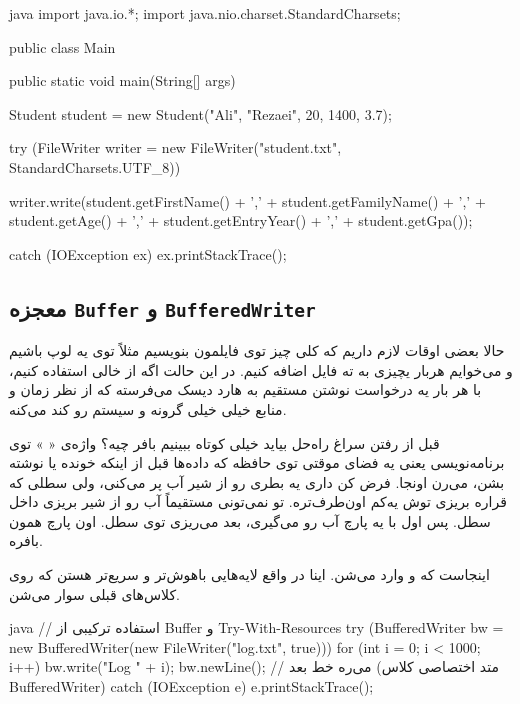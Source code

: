 \begin{codebox}{java}
import java.io.*;
import java.nio.charset.StandardCharsets;

public class Main {
    public static void main(String[] args) {
        Student student = new Student("Ali", "Rezaei", 20, 1400, 3.7);
        
        try (FileWriter writer = new FileWriter("student.txt", StandardCharsets.UTF_8)) {
            
            writer.write(student.getFirstName() + ',' + 
                         student.getFamilyName() + ',' +
                         student.getAge() + ',' + 
                         student.getEntryYear() + ',' + 
                         student.getGpa());
                         
        } catch (IOException ex) {
            ex.printStackTrace();
        }
    }
}
\end{codebox}

\subsection{معجزه \texttt{Buffer} و \texttt{BufferedWriter}}

حالا بعضی اوقات لازم داریم که کلی چیز توی فایلمون بنویسیم مثلاً توی یه
لوپ باشیم و می‌خوایم هربار یچیزی به ته فایل اضافه کنیم. در این حالت اگه
از  خالی استفاده کنیم، با هر بار
 یه درخواست نوشتن مستقیم به هارد دیسک می‌فرسته که از
نظر زمان و منابع خیلی خیلی گرونه و سیستم رو کند می‌کنه.

قبل از رفتن سراغ راه‌حل بیاید خیلی کوتاه ببینیم بافر چیه؟ واژه‌ی «
 » توی برنامه‌نویسی یعنی یه فضای موقتی توی حافظه  که
داده‌ها قبل از اینکه خونده یا نوشته بشن، می‌رن اونجا. فرض کن داری یه بطری
رو از شیر آب پر می‌کنی، ولی سطلی که قراره بریزی توش یه‌کم اون‌طرف‌تره. تو
نمی‌تونی مستقیماً آب رو از شیر بریزی داخل سطل. پس اول با یه پارچ آب رو
می‌گیری، بعد می‌ریزی توی سطل. اون پارچ همون بافره.

اینجاست که  و 
وارد می‌شن. اینا در واقع لایه‌هایی باهوش‌تر و سریع‌تر هستن که روی کلاس‌های
قبلی سوار می‌شن.

\begin{codebox}{java}
// استفاده ترکیبی از Buffer و Try-With-Resources
try (BufferedWriter bw = new BufferedWriter(new FileWriter("log.txt", true))) {
    for (int i = 0; i < 1000; i++) {
        bw.write("Log " + i);
        bw.newLine(); // می‌ره خط بعد (متد اختصاصی کلاس BufferedWriter)
    }
} catch (IOException e) {
    e.printStackTrace();
}
\end{codebox}


